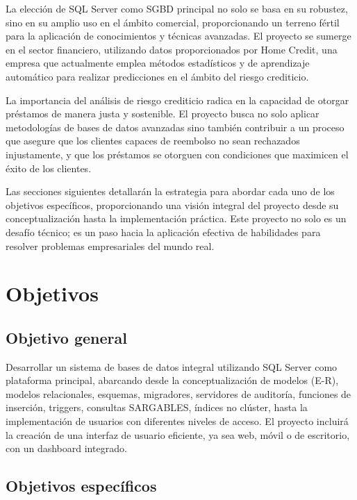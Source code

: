 La elección de SQL Server como SGBD principal no solo se basa en su robustez,
sino en su amplio uso en el ámbito comercial, proporcionando un terreno fértil
para la aplicación de conocimientos y técnicas avanzadas. El proyecto se
sumerge en el sector financiero, utilizando datos proporcionados por Home
Credit, una empresa que actualmente emplea métodos estadísticos y de
aprendizaje automático para realizar predicciones en el ámbito del riesgo
crediticio.

La importancia del análisis de riesgo crediticio radica en la capacidad de
otorgar préstamos de manera justa y sostenible. El proyecto busca no solo
aplicar metodologías de bases de datos avanzadas sino también contribuir a un
proceso que asegure que los clientes capaces de reembolso no sean rechazados
injustamente, y que los préstamos se otorguen con condiciones que maximicen el
éxito de los clientes.

Las secciones siguientes detallarán la estrategia para abordar cada uno de los
objetivos específicos, proporcionando una visión integral del proyecto desde su
conceptualización hasta la implementación práctica. Este proyecto no solo es un
desafío técnico; es un paso hacia la aplicación efectiva de habilidades para
resolver problemas empresariales del mundo real.

\section{Objetivos}

\subsection{Objetivo general}

Desarrollar un sistema de bases de datos integral utilizando SQL Server como
plataforma principal, abarcando desde la conceptualización de modelos (E-R),
modelos relacionales, esquemas, migradores, servidores de auditoría, funciones
de inserción, triggers, consultas SARGABLES, índices no clúster, hasta la
implementación de usuarios con diferentes niveles de acceso. El proyecto
incluirá la creación de una interfaz de usuario eficiente, ya sea web, móvil o
de escritorio, con un dashboard integrado.

\subsection{Objetivos específicos}

